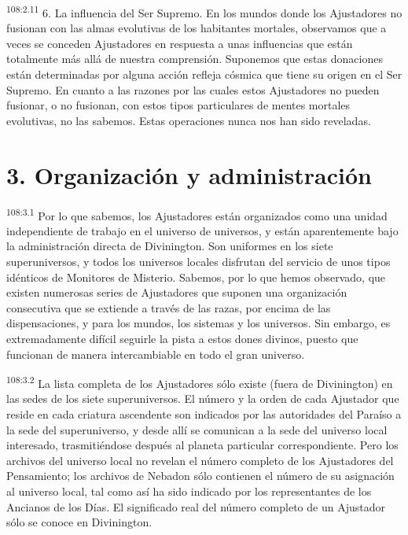 \par
\textsuperscript{108:2.11} 6. La influencia del Ser Supremo. En los mundos donde los Ajustadores no fusionan con las almas evolutivas de los habitantes mortales, observamos que a veces se conceden Ajustadores en respuesta a unas influencias que están totalmente más allá de nuestra comprensión. Suponemos que estas donaciones están determinadas por alguna acción refleja cósmica que tiene su origen en el Ser Supremo. En cuanto a las razones por las cuales estos Ajustadores no pueden fusionar, o no fusionan, con estos tipos particulares de mentes mortales evolutivas, no las sabemos. Estas operaciones nunca nos han sido reveladas.

\section*{3. Organización y administración}
\par
\textsuperscript{108:3.1} Por lo que sabemos, los Ajustadores están organizados como una unidad independiente de trabajo en el universo de universos, y están aparentemente bajo la administración directa de Divinington. Son uniformes en los siete superuniversos, y todos los universos locales disfrutan del servicio de unos tipos idénticos de Monitores de Misterio. Sabemos, por lo que hemos observado, que existen numerosas series de Ajustadores que suponen una organización consecutiva que se extiende a través de las razas, por encima de las dispensaciones, y para los mundos, los sistemas y los universos. Sin embargo, es extremadamente difícil seguirle la pista a estos dones divinos, puesto que funcionan de manera intercambiable en todo el gran universo.

\par
\textsuperscript{108:3.2} La lista completa de los Ajustadores sólo existe (fuera de Divinington) en las sedes de los siete superuniversos. El número y la orden de cada Ajustador que reside en cada criatura ascendente son indicados por las autoridades del Paraíso a la sede del superuniverso, y desde allí se comunican a la sede del universo local interesado, trasmitiéndose después al planeta particular correspondiente. Pero los archivos del universo local no revelan el número completo de los Ajustadores del Pensamiento; los archivos de Nebadon sólo contienen el número de su asignación al universo local, tal como así ha sido indicado por los representantes de los Ancianos de los Días. El significado real del número completo de un Ajustador sólo se conoce en Divinington.

